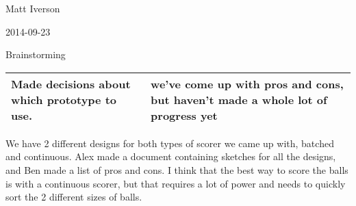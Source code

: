 Matt Iverson

2014-09-23

Brainstorming

\begin{tabular}{|p{5cm}|p{5cm}|}
 \hline
 Made decisions about which prototype to use.
&
 we’ve come up with pros and cons, but haven’t made a whole lot of progress yet
\\
 \hline
\end{tabular}

We have 2 different designs for both types of scorer we came up with, batched and continuous. Alex made a document containing sketches for all the designs, and Ben made a list of pros and cons. I think that the best way to score the balls is with a continuous scorer, but that requires a lot of power and needs to quickly sort the 2 different sizes of balls.
